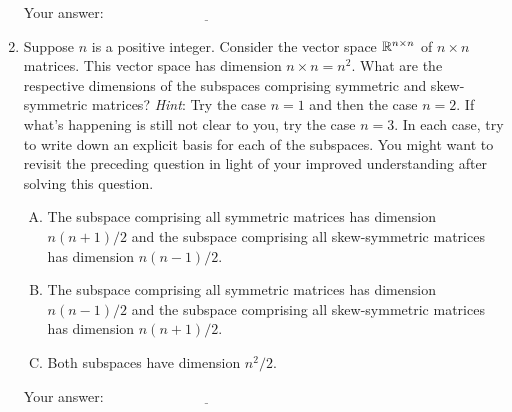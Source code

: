 \documentclass[10pt]{amsart}
\begin{document}
\begin{enumerate}
  \vspace{0.1in}
  Your answer: $\underline{\qquad\qquad\qquad\qquad\qquad\qquad\qquad}$
  \vspace{0.1in}

\item Suppose $n$ is a positive integer. Consider the vector space
  $\mathbb{R}^{n \times n}$ of $n \times n$ matrices. This vector space has
  dimension $n \times n = n^2$. What are the respective dimensions of
  the subspaces comprising symmetric and skew-symmetric matrices? {\em
    Hint}: Try the case $n = 1$ and then the case $n = 2$. If what's
  happening is still not clear to you, try the case $n = 3$. In each
  case, try to write down an explicit basis for each of the
  subspaces. You might want to revisit the preceding question in light
  of your improved understanding after solving this question.

  \begin{enumerate}[(A)]
  \item The subspace comprising all symmetric matrices has dimension
    $n(n + 1)/2$ and the subspace comprising all skew-symmetric
    matrices has dimension $n(n - 1)/2$.
  \item The subspace comprising all symmetric matrices has dimension
    $n(n - 1)/2$ and the subspace comprising all skew-symmetric
    matrices has dimension $n(n + 1)/2$.
  \item Both subspaces have dimension $n^2/2$.
  \end{enumerate}

  \vspace{0.1in}
  Your answer: $\underline{\qquad\qquad\qquad\qquad\qquad\qquad\qquad}$
  \vspace{0.1in}

\end{enumerate}
\end{document}
